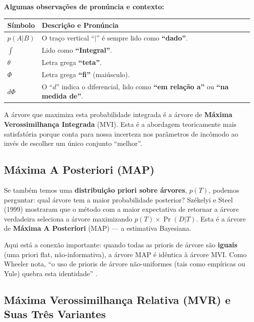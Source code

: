 \vspace{0.5cm}

\textbf{Algumas observações de pronúncia e contexto:}

\begin{center}
\renewcommand{\arraystretch}{1.5}
\begin{tabular}{lp{10cm}}
\hline
\textbf{Símbolo} & \textbf{Descrição e Pronúncia} \\ \hline
$p(A|B)$ & O traço vertical ``$|$'' é sempre lido como \textbf{``dado''}. \\
$\int$ & Lido como \textbf{``Integral''}. \\
$\theta$ & Letra grega \textbf{``teta''}. \\
$\Phi$ & Letra grega \textbf{``fi''} (maiúsculo). \\
$d\Phi$ & O ``$d$'' indica o diferencial, lido como \textbf{``em relação a''} ou \textbf{``na medida de''}. \\ \hline
\end{tabular}
\end{center}

A árvore que maximiza esta probabilidade integrada é a árvore de \textbf{Máxima Verossimilhança Integrada} (MVI). Esta é a abordagem teoricamente mais satisfatória porque conta para nossa incerteza nos parâmetros de incômodo ao invés de escolher um único conjunto ``melhor''.

\subsection{Máxima A Posteriori (MAP)}

Se também temos uma \textbf{distribuição priori sobre árvores}, $p(T)$, podemos perguntar: qual árvore tem a maior probabilidade posterior? Székelyi e Steel (1999) mostraram que o método com a maior expectativa de retornar a árvore verdadeira seleciona a árvore maximizando $p(T) \times \Pr(D|T)$. Esta é a árvore de \textbf{Máxima A Posteriori} (MAP) --- a estimativa Bayesiana.

Aqui está a conexão importante: quando todas as prioris de árvore são \textbf{iguais} (uma priori flat, não-informativa), a árvore MAP é idêntica à árvore MVI. Como Wheeler nota, ``o uso de prioris de árvore não-uniformes (tais como empíricas ou Yule) quebra esta identidade'' \parencite{wheeler2012}.

\subsection{Máxima Verossimilhança Relativa (MVR) e Suas Três Variantes}

